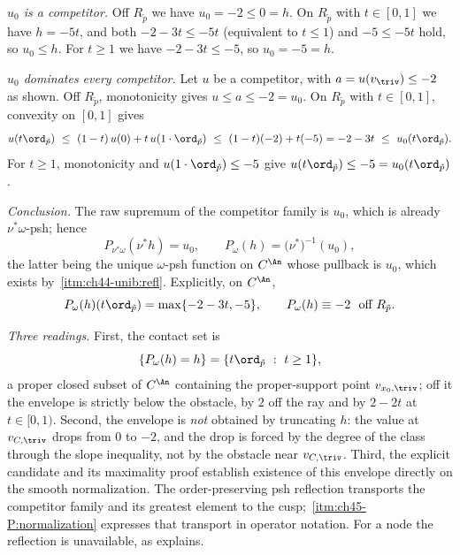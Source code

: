 \begin{example}
\emph{$u_0$ is a competitor.}  Off $R_{\tilde p}$ we have
$u_0=-2\le0=h$.  On $R_{\tilde p}$ with $t\in[0,1]$ we have
$h=-5t$, and both $-2-3t\le-5t$ (equivalent to $t\le1$) and
$-5\le-5t$ hold, so $u_0\le h$.  For $t\ge1$ we have $-2-3t\le-5$,
so $u_0=-5=h$.

\emph{$u_0$ dominates every competitor.}  Let $u$ be a competitor, with
$a=u(v_{\triv})\le-2$ as shown.  Off $R_{\tilde p}$, monotonicity gives
$u\le a\le-2=u_0$.  On $R_{\tilde p}$ with $t\in[0,1]$, convexity on
$[0,1]$ gives
\[
 u(t\ord_{\tilde p})\ \le\ (1-t)\,u(0)+t\,u(1\cdot\ord_{\tilde p})
 \ \le\ (1-t)(-2)+t(-5)=-2-3t\ \le\ u_0(t\ord_{\tilde p}).
\]
For $t\ge1$, monotonicity and $u(1\cdot\ord_{\tilde p})\le-5$ give
$u(t\ord_{\tilde p})\le-5=u_0(t\ord_{\tilde p})$.

\emph{Conclusion.}  The raw supremum of the competitor family is $u_0$,
which is already $\nu^*\omega$-psh; hence
\[
 P_{\nu^*\omega}(\nu^*h)=u_0,
 \qquad
 P_\omega(h)=\bigl(\nu^*\bigr)^{-1}(u_0),
\]
the latter being the unique $\omega$-psh function on $C^{\An}$ whose
pullback is $u_0$, which exists by
\,\cref{itm:ch44-unib:refl}.
Explicitly, on $C^{\An}$,
\[
 P_\omega(h)(t\ord_{\tilde p})=\max\{-2-3t,-5\},
 \qquad
 P_\omega(h)\equiv-2\ \text{ off }R_{\tilde p}.
\]

\emph{Three readings.}  First, the contact set is
\[
 \{P_\omega(h)=h\}=\{t\ord_{\tilde p}\ :\ t\ge1\},
\]
a proper closed subset of $C^{\An}$ containing the proper-support point
$v_{x_0,\triv}$; off it the envelope is strictly below the obstacle, by
$2$ off the ray and by $2-2t$ at $t\in[0,1)$.  Second, the envelope is
\emph{not} obtained by truncating $h$: the value at $v_{C,\triv}$ drops
from $0$ to $-2$, and the drop is forced by the degree of the class
through the slope inequality, not by the obstacle near $v_{C,\triv}$.
Third, the explicit candidate and its maximality proof establish existence
of this envelope directly on the smooth normalization.  The order-preserving
psh reflection transports the competitor family and its greatest element
to the cusp; \,\cref{itm:ch45-P:normalization}
expresses that transport in operator notation.
For a node the reflection is unavailable, as
 explains.
\end{example}

